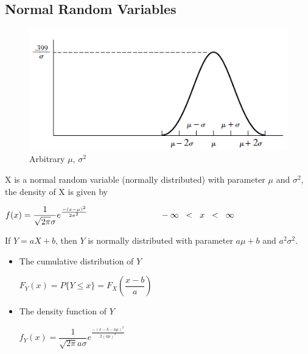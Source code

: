  \newpage
\subsection{Normal Random Variables}
	\begin{figure}[htp]
	\begin{center}
		\includegraphics[scale=0.8]{figure3}
	\end{center}
	\label{reffig3}
	\caption{Arbitrary $\mu$, $\sigma^2$}
\end{figure}
X is a normal random variable (normally distributed) with parameter $\mu$ and $\sigma^2$, the density of X is given by
\begin{center}
	$f(x)=\dfrac{1}{\sqrt{2\pi}\sigma}e^\frac{-(x-\mu)^2}{2\sigma^2}  \hspace{3cm} -\infty\hspace{0.2cm}<\hspace{0.2cm} x\hspace{0.2cm}<\hspace{0.2cm}\infty$
\end{center}
If $Y=aX+b$, then $Y$ is normally distributed with parameter $a\mu+b$ and $a^2\sigma^2$.
\begin{itemize}
	\item The cumulative distribution of $Y$
	\begin{center}
		$F_Y(x)=P\{Y\leq x\}=F_X\left(\dfrac{x-b}{a}\right)$
	\end{center}
	\item The density function of $Y$
	\begin{center}
		$f_Y(x)=\dfrac{1}{\sqrt{2\pi}a\sigma}e^\frac{-(x-b-a\mu)^2}{2(a\mu)^2}$
	\end{center}
\end{itemize}

\newpage
